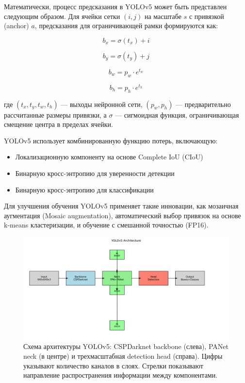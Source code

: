 Математически, процесс предсказания в YOLOv5 может быть представлен следующим образом. Для ячейки сетки $(i,j)$ на масштабе $s$ с привязкой (anchor) $a$, предсказания для ограничивающей рамки формируются как:

\begin{equation}
b_x = \sigma(t_x) + i
\end{equation}

\begin{equation}
b_y = \sigma(t_y) + j
\end{equation}

\begin{equation}
b_w = p_w \cdot e^{t_w}
\end{equation}

\begin{equation}
b_h = p_h \cdot e^{t_h}
\end{equation}

где $(t_x, t_y, t_w, t_h)$ — выходы нейронной сети, $(p_w, p_h)$ — предварительно рассчитанные размеры привязки, а $\sigma$ — сигмоидная функция, ограничивающая смещение центра в пределах ячейки.

YOLOv5 использует комбинированную функцию потерь, включающую:
\begin{itemize}
    \item Локализационную компоненту на основе Complete IoU (CIoU)
    \item Бинарную кросс-энтропию для уверенности детекции
    \item Бинарную кросс-энтропию для классификации
\end{itemize}

Для улучшения обучения YOLOv5 применяет такие инновации, как мозаичная аугментация (Mosaic augmentation), автоматический выбор привязок на основе k-means кластеризации, и обучение с смешанной точностью (FP16).

\begin{figure}[h]
\centering
\includegraphics[width=\textwidth]{Dissertation/images/yolov5_architecture.png}
\caption{Схема архитектуры YOLOv5: CSPDarknet backbone (слева), PANet neck (в центре) и трехмасштабная detection head (справа). Цифры указывают количество каналов в слоях. Стрелки показывают направление распространения информации между компонентами.}
\label{fig:yolov5_arch}
\end{figure}

